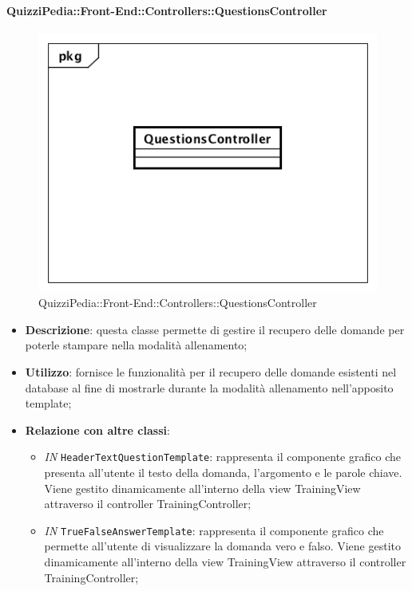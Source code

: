 \begin{itemize}
\paragraph{QuizziPedia::Front-End::Controllers::QuestionsController}
\begin{figure} [ht]
	\centering
	\includegraphics[scale=0.45]{UML/Classi/Front-End/QuizziPedia_Front-end_Controller_QuestionsController.png}
	\caption{QuizziPedia::Front-End::Controllers::QuestionsController}
\end{figure} \FloatBarrier
\begin{itemize}
	\item \textbf{Descrizione}: questa classe permette di gestire il recupero delle domande per poterle stampare nella modalità allenamento;
	\item \textbf{Utilizzo}: fornisce le funzionalità per il recupero delle domande esistenti nel database al fine di mostrarle durante la modalità allenamento nell'apposito template;
	\item \textbf{Relazione con altre classi}:
	\begin{itemize}
		\item \textit{IN} \texttt{HeaderTextQuestionTemplate}: rappresenta il componente grafico che presenta all'utente il testo della domanda, l'argomento e le parole chiave. Viene gestito dinamicamente all'interno della view TrainingView attraverso il controller TrainingController; 
		\item \textit{IN} \texttt{TrueFalseAnswerTemplate}: rappresenta il componente grafico che permette all'utente di visualizzare la domanda vero e falso. Viene gestito dinamicamente all'interno della view TrainingView attraverso il controller TrainingController; 

\end{itemize}
\end{itemize}
\end{itemize}
